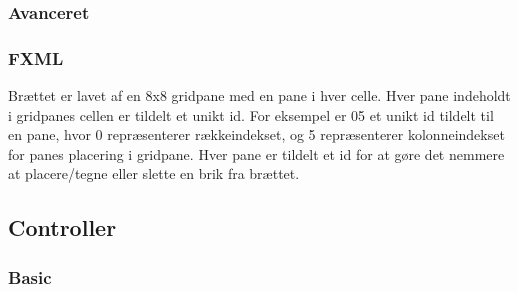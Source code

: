 \subsubsection{Avanceret}

\subsubsection{FXML}\label{BD}
Brættet er lavet af en 8x8 gridpane med en pane i hver celle. Hver pane indeholdt i gridpanes cellen er tildelt et unikt id. For eksempel er 05 et unikt id tildelt til en pane, hvor 0 repræsenterer rækkeindekset, og 5 repræsenterer kolonneindekset for panes placering i gridpane. Hver pane er tildelt et id for at gøre det nemmere at placere/tegne eller slette en brik fra brættet.


\subsection{Controller}

\subsubsection{Basic}

